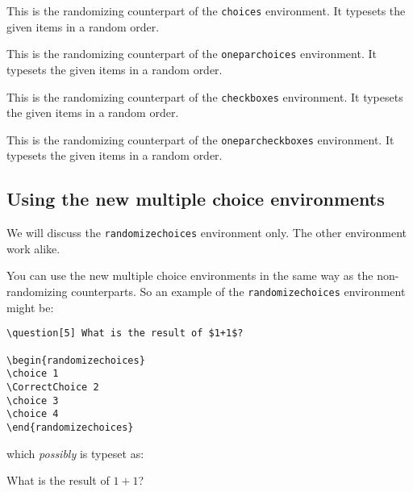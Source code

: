 \documentclass[12pt,a4paper]{exam}
\begin{document}
\begin{description}[labelindent=2ex]
\item[\texttt{randomizechoices}] This is the randomizing counterpart of the
\texttt{choices} environment. It typesets the given items in a random order.

\item[\texttt{randomizeoneparchoices}] This is the randomizing counterpart of the
\texttt{oneparchoices} environment. It typesets the given items in a random order.

\item[\texttt{randomizecheckboxes}] This is the randomizing counterpart of the
\texttt{checkboxes} environment. It typesets the given items in a random order.

\item[\texttt{randomizeoneparcheckboxes}] This is the randomizing counterpart of the \linebreak
\texttt{oneparcheckboxes} environment. It typesets the given items in a random order.

\end{description}


\subsection{Using the new multiple choice environments}
We will discuss the \texttt{randomizechoices} environment only. The other
environment work alike.

You can use the new multiple choice environments in the same way as the non-randomizing counterparts.
So an example of the \texttt{randomizechoices} environment might be:

\begin{lstlisting}
\question[5] What is the result of $1+1$?

\begin{randomizechoices}
\choice 1
\CorrectChoice 2
\choice 3
\choice 4
\end{randomizechoices}
\end{lstlisting}

which \emph{possibly} is typeset as:

\begin{questions}
\setcounter{question}{6}
\question[5] What is the result of $1+1$?

\begin{randomizechoices}
\end{randomizechoices}
\end{questions}
\end{document}
